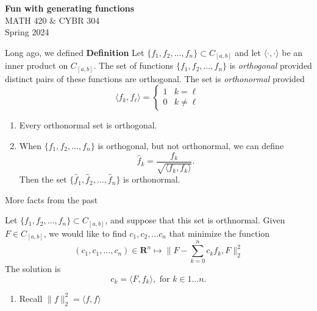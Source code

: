 \documentclass[portrait,fleqn,12pt]{beamer}
\newcommand{\reals}{\mathbf{R}}
\newenvironment{handlist}
   {\begin{enumerate}[\faHandPointRight]
       \addtolength{\itemsep}{0.0\itemsep}}
     {\end{enumerate}}
\newenvironment{define}[1]{
  \textbf{Definition} #1}{}
\begin{document}
\begin{frame}
\begin{flushleft} 
\textbf{Fun with generating functions} \\
MATH 420 \& CYBR 304 \\
Spring 2024 
\end{flushleft}



\end{frame}

\begin{frame}{Long ago, we defined}
\begin{define}
Let $\{f_1, f_2, \dots, f_n \}  \subset  C_{[a,b]}$ and let $\langle \cdot, \cdot \rangle$ be an inner product
on $C_{[a,b]}$.  The set of functions $\{f_1, f_2, \dots, f_n \}$ is \emph{orthogonal} provided distinct pairs
of these functions are orthogonal.  The set is \emph{orthonormal} provided
\begin{equation}
\langle f_k, f_\ell \rangle = \begin{cases} 1 & k=\ell \\ 0 & k \neq \ell \end{cases}
\end{equation}
\end{define}

\begin{handlist}
\item Every orthonormal set is orthogonal.

\item When $\{f_1, f_2, \dots, f_n \} $ is orthogonal, but not orthonormal, we can define
\begin{equation}
   \widehat f_k = \frac{f_k}{\sqrt{ \langle f_k, f_k \rangle}}.
\end{equation}
Then the set $\{\widehat f_1, \widehat f_2, \dots, \widehat f_n \}$ is orthonormal.
\end{handlist}
\end{frame}

\begin{frame}{More facts from the past}

Let  $\{f_1, f_2, \dots, f_n \} \subset C_{[a,b]}$, and suppose that this set is orthnormal. Given $F \in C_{[a,b]}$,
we would like to find $c_1, c_2, \dots c_n$ that minimize the function
\begin{equation}
  (c_1, c_1, \dots, c_n) \in \reals^n \mapsto \| F - \sum_{k=0}^n c_k f_k, F  \|_2^2
 \end{equation}
The solution is
\begin{equation}
   c_k  =  \langle F, f_k \rangle, \text{ for } k \in 1 \dots n.
\end{equation}
\begin{handlist}
\item Recall $\| f \|_2^2 = \langle f, f \rangle$
\end{handlist}
\end{frame}
\end{document}
